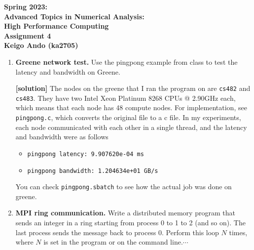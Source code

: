 \documentclass[11pt]{article}
\begin{document}
\begin{center}
  \vspace*{-2cm}
  \begin{center}
  \large \textbf{%
    Spring 2023: \\
    Advanced Topics in Numerical Analysis:\\ 
    High Performance Computing}\\
    \textbf{ Assignment 4}\\
    \textbf{Keigo Ando (ka2705)} 
  \end{center}
\end{center}  

  \hspace{3ex}


\begin{enumerate}
\item \textbf{Greene network test.} Use the pingpong example from class to test the latency and bandwidth on Greene. \\
  \hspace{2ex}

  \textbf{[solution]}  The nodes on the greene that I ran the program on are \texttt{cs482} and \texttt{cs483}. They have two Intel Xeon Platinum 8268 CPUs @ 2.90GHz each, which means that each node has 48 compute nodes. For implementation, see \texttt{pingpong.c}, which converts the original file to a c file. 
  In my experiments, each node communicated with each other in a single thread, and the latency and bandwidth were as follows
\begin{itemize}
    \item \texttt{pingpong latency: 9.907620e-04 ms}
    \item \texttt{pingpong bandwidth: 1.204634e+01 GB/s}
\end{itemize} 
You can check \texttt{pingpong.sbatch} to see how the actual job was done on greene.

\item \textbf{MPI ring communication.} Write a distributed memory program that sends an integer in a ring starting from process 0 to 1 to 2 (and so on). The last process sends the message back to process 0. Perform this loop $N$ times, where $N$ is set in the program or on the command line.$\cdots$\\
  \hspace{2ex}


\end{enumerate}
\end{document}
